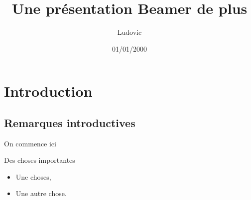 \documentclass[11pt]{beamer}
\author{Ludovic}
\title{Une présentation Beamer de plus}
\institute{Université de Savoie Mont Blanc}
\date{01/01/2000}
\begin{document}
\begin{frame}[plain]
\titlepage
\end{frame}

\begin{frame}
\tableofcontents
\end{frame}

\section{Introduction}
\subsection{Remarques introductives}

\begin{frame}{On commence ici}
  \begin{block}{Des choses importantes}
    \begin{itemize}
      \item Une choses,
      \item Une autre chose.
    \end{itemize}
  \end{block}
\end{frame}
\end{document}
